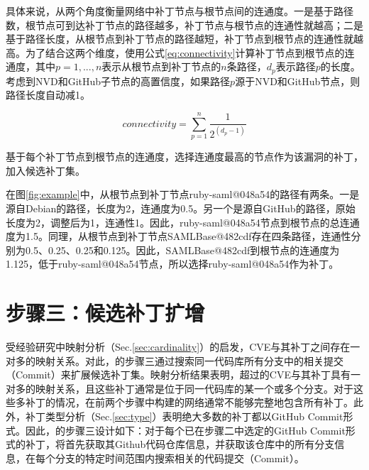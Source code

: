 具体来说，\tool 从两个角度衡量网络中补丁节点与根节点间的连通度。一是基于路径数，根节点可到达补丁节点的路径越多，补丁节点与根节点的连通性就越高；二是基于路径长度，从根节点到补丁节点的路径越短，补丁节点到根节点的连通性就越高。为了结合这两个维度，\tool 使用公式\ref{eq:connectivity}计算补丁节点到根节点的连通度，其中$ p = 1, ..., n$表示从根节点到补丁节点的$n$条路径，$d_p$表示路径$p$的长度。考虑到NVD和GitHub子节点的高置信度，如果路径$p$源于NVD和GitHub节点，则路径长度自动减1。

\begin{equation}\label{eq:connectivity}
    connectivity =\sum_{p=1}^{n}   \frac{1}{2^{({d}_{p} -1)}}
\end{equation}

基于每个补丁节点到根节点的连通度，\tool 选择连通度最高的节点作为该漏洞的补丁，加入候选补丁集。

\begin{exmp}
在图\ref{fig:example}中，从根节点到补丁节点ruby-saml@048a54的路径有两条。一是源自Debian的路径，长度为2，连通度为0.5。另一个是源自GitHub的路径，原始长度为2，调整后为1，连通性1。因此，ruby-saml@048a54节点到根节点的总连通度为1.5。同理，从根节点到补丁节点SAMLBase@482cdf存在四条路径，连通性分别为0.5、0.25、0.25和0.125。因此，SAMLBase@482cdf到根节点的连通度为1.125，低于ruby-saml@048a54节点，所以\tool 选择ruby-saml@048a54作为补丁。%
\end{exmp}


\section{步骤三：候选补丁扩增}
受经验研究中映射分析（Sec.\ref{sec:cardinality}）的启发，CVE与其补丁之间存在一对多的映射关系。对此，\tool 的步骤三通过搜索同一代码库所有分支中的相关提交（Commit）来扩展候选补丁集。映射分析结果表明，超过的CVE与其补丁具有一对多的映射关系，且这些补丁通常是位于同一代码库的某一个或多个分支。对于这些多补丁的情况，\tool 在前两个步骤中构建的网络通常不能够完整地包含所有补丁。此外，补丁类型分析（Sec.\ref{sec:type}）表明绝大多数的补丁都以GitHub Commit形式。因此，\tool 的步骤三设计如下：对于每个已在步骤二中选定的GitHub Commit形式的补丁，\tool 将首先获取其Github代码仓库信息，并获取该仓库中的所有分支信息，在每个分支的特定时间范围内搜索相关的代码提交（Commit）。

